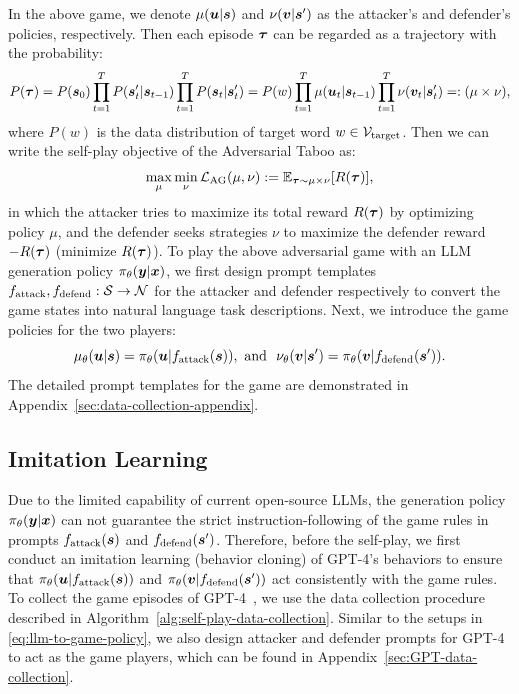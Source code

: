 \documentclass{article}
\theoremstyle{plain}
\theoremstyle{definition}
\theoremstyle{remark}
\begin{document}
In the above game, we denote $\mu({\bm{u}}|{\bm{s}})$  and $\nu({\bm{v}}|{\bm{s}}')$ as the attacker's and defender's policies, respectively. Then each episode $\bm{\tau} $ can be regarded as a 
trajectory with the probability:
\begin{equation}
 P(\bm{\tau}) = P({\bm{s}}_0) \prod_{t=1}^T P({\bm{s}}'_t|{\bm{s}}_{t-1}) \prod_{t=1}^T P({\bm{s}}_t|{\bm{s}}'_t) =P(w) \prod_{t=1}^T \mu({\bm{u}}_{t} |{\bm{s}}_{t-1}) \prod_{t=1}^T \nu({\bm{v}}_t| {\bm{s}}'_t) = :(\mu \times \nu),
\end{equation}
where $P(w)$ is the data distribution of target word $w\in{\mathcal{V}}_\text{target}$.
Then we can write the self-play objective of the Adversarial Taboo as:
\begin{equation}
    \label{eq:adversarial-game-objective}
    \max_{\mu} \min_{\nu} {\mathcal{L}}_\text{AG}(\mu, \nu) := \mathbb{E}_{{\bm{\tau}}\sim {\mu \times \nu}} [R(\bm{\tau})],
\end{equation}
in which the attacker tries to maximize its total reward $R(\bm{\tau})$ by optimizing policy $\mu$, and the defender seeks strategies $\nu$ to maximize the defender reward $-R(\bm{\tau})$ (minimize $R(\bm{\tau})$).
%
%
To play the above adversarial game with an LLM generation policy $\pi_\theta({\bm{y}}| {\bm{x}})$, we first design prompt templates $f_\text{attack}, f_\text{defend}: {\mathcal{S}} \rightarrow {\mathcal{N}}$ for the attacker and defender respectively to convert the game states into natural language task descriptions. Next, we introduce the game policies for the two players:
\begin{equation}\label{eq:llm-to-game-policy}
    \mu_\theta({\bm{u}} | {\bm{s}}) = \pi_\theta({\bm{u}} | f_\text{attack}({\bm{s}})),  \text{ and \  } \nu_\theta({\bm{v}} |{\bm{s}}') = \pi_\theta({\bm{v}}| f_\text{defend}({\bm{s}}')).
\end{equation}
The detailed prompt templates for the game are demonstrated in Appendix~\ref{sec:data-collection-appendix}.



\vspace{-1.5mm}
\subsection{Imitation Learning} \label{sec:imitation-learning}
\vspace{-1.5mm}
Due to the limited capability 
of current open-source LLMs, the generation policy $\pi_\theta({\bm{y}}|{\bm{x}})$ can not guarantee the strict instruction-following of the game rules in prompts $f_\text{attack}({\bm{s}})$ and $f_\text{defend}({\bm{s}}')$. Therefore, before the self-play, we first conduct an imitation learning (behavior cloning) of GPT-4's behaviors to ensure that 
$\pi_\theta({\bm{u}}|f_\text{attack}({\bm{s}}))$ and $\pi_\theta({\bm{v}}|f_\text{defend}({\bm{s}}'))$ 
act consistently with the game rules.
%
To collect the game episodes of GPT-4~\citep{achiam2023gpt}, we use the data collection procedure described in Algorithm~\ref{alg:self-play-data-collection}. Similar to the setups in \eqref{eq:llm-to-game-policy}, we also design attacker and defender prompts for GPT-4 to act as the game players, which can be found in Appendix~\ref{sec:GPT-data-collection}.
\end{document}
